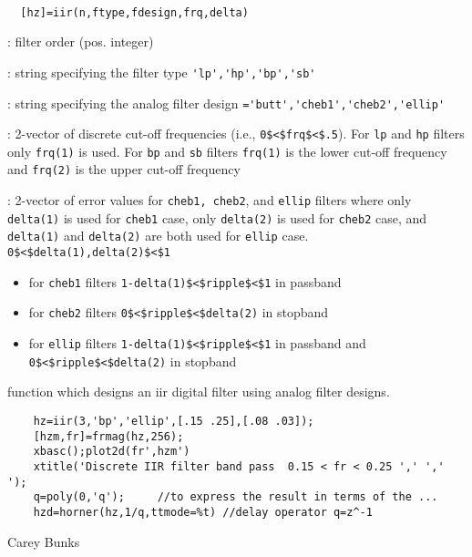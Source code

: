 \begin{mandesc}
   \\ %
\end{mandesc}
\begin{calling_sequence}
\begin{verbatim}
  [hz]=iir(n,ftype,fdesign,frq,delta)  
\end{verbatim}
\end{calling_sequence}
\begin{parameters}
  \begin{varlist}
    : filter order (pos. integer)

    : string specifying the filter type \verb!'lp','hp','bp','sb'!

    : string specifying the analog filter design
    \verb!='butt','cheb1','cheb2','ellip'!

    : 2-vector of discrete cut-off frequencies (i.e.,
    \verb!0$<$frq$<$.5!). For \verb!lp! and \verb!hp! filters only \verb!frq(1)!
    is used. For \verb!bp! and \verb!sb! filters \verb!frq(1)! is the lower
    cut-off frequency and \verb!frq(2)! is the upper cut-off frequency

    : 2-vector of error values for \verb!cheb1, cheb2!, and
    \verb!ellip! filters where only \verb!delta(1)! is used for \verb!cheb1!
    case, only \verb!delta(2)! is used for \verb!cheb2! case, and
    \verb!delta(1)! and \verb!delta(2)! are both used for \verb!ellip!
    case. \verb!0$<$delta(1),delta(2)$<$1!
    \begin{itemize}
    \item for \verb!cheb1! filters \verb!1-delta(1)$<$ripple$<$1! in passband
    \item for \verb!cheb2! filters \verb!0$<$ripple$<$delta(2)! in stopband
    \item for \verb!ellip! filters \verb!1-delta(1)$<$ripple$<$1! in passband
      and \verb!0$<$ripple$<$delta(2)! in stopband \end{itemize}
  \end{varlist}
\end{parameters}
\begin{mandescription}
  function which designs an iir digital filter using analog filter designs.
\end{mandescription}
\begin{examples}
  \begin{Verbatim}
    hz=iir(3,'bp','ellip',[.15 .25],[.08 .03]);
    [hzm,fr]=frmag(hz,256);
    xbasc();plot2d(fr',hzm')
    xtitle('Discrete IIR filter band pass  0.15 < fr < 0.25 ',' ',' ');
    q=poly(0,'q');     //to express the result in terms of the ...
    hzd=horner(hz,1/q,ttmode=%t) //delay operator q=z^-1
  \end{Verbatim}
\end{examples}
\begin{manseealso}
     
\end{manseealso}
\begin{authors}
    Carey Bunks  
\end{authors}
